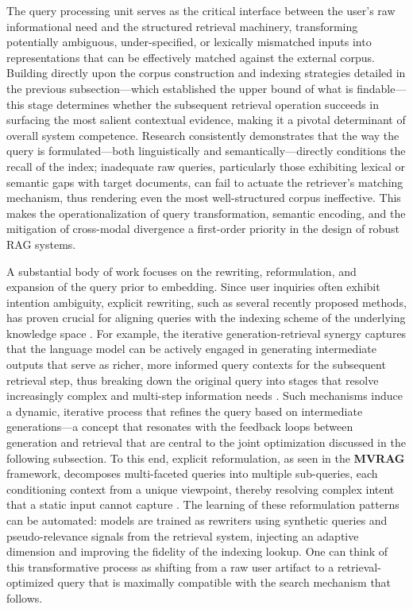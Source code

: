 \documentclass[11pt,a4paper]{article}
\begin{document}
The query processing unit serves as the critical interface between the user's raw informational need and the structured retrieval machinery, transforming potentially ambiguous, under-specified, or lexically mismatched inputs into representations that can be effectively matched against the external corpus. Building directly upon the corpus construction and indexing strategies detailed in the previous subsection---which established the upper bound of what is findable---this stage determines whether the subsequent retrieval operation succeeds in surfacing the most salient contextual evidence, making it a pivotal determinant of overall system competence. Research consistently demonstrates that the way the query is formulated---both linguistically and semantically---directly conditions the recall of the index; inadequate raw queries, particularly those exhibiting lexical or semantic gaps with target documents, can fail to actuate the retriever's matching mechanism, thus rendering even the most well-structured corpus ineffective. This makes the operationalization of query transformation, semantic encoding, and the mitigation of cross-modal divergence a first-order priority in the design of robust RAG systems.

A substantial body of work focuses on the rewriting, reformulation, and expansion of the query prior to embedding. Since user inquiries often exhibit intention ambiguity, explicit rewriting, such as several recently proposed methods, has proven crucial for aligning queries with the indexing scheme of the underlying knowledge space \cite{arxiv:2005.11401v4}. For example, the iterative generation-retrieval synergy captures that the language model can be actively engaged in generating intermediate outputs that serve as richer, more informed query contexts for the subsequent retrieval step, thus breaking down the original query into stages that resolve increasingly complex and multi-step information needs \cite{arxiv:2305.15294v2}. Such mechanisms induce a dynamic, iterative process that refines the query based on intermediate generations---a concept that resonates with the feedback loops between generation and retrieval that are central to the joint optimization discussed in the following subsection. To this end, explicit reformulation, as seen in the \textbf{MVRAG} framework, decomposes multi-faceted queries into multiple sub-queries, each conditioning context from a unique viewpoint, thereby resolving complex intent that a static input cannot capture \cite{arxiv:2305.15294v2}. The learning of these reformulation patterns can be automated: models are trained as rewriters using synthetic queries and pseudo-relevance signals from the retrieval system, injecting an adaptive dimension and improving the fidelity of the indexing lookup. One can think of this transformative process as shifting from a raw user artifact to a retrieval-optimized query that is maximally compatible with the search mechanism that follows.
\end{document}
